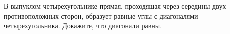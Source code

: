 \begin{ex}
	\begin{condition}
		В выпуклом четырехугольнике прямая, проходящая через середины двух противоположных сторон, образует равные углы с диагоналями четырехугольника. Докажите, что диагонали равны.
	\end{condition}
\end{ex}